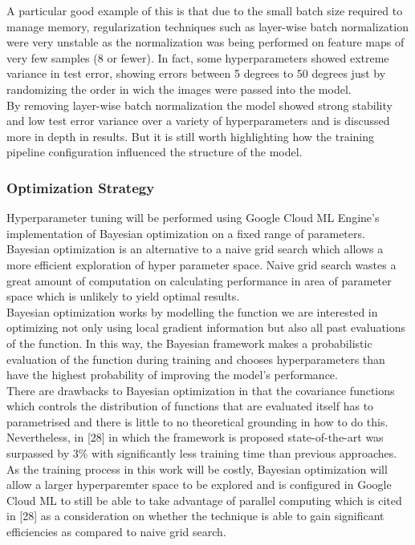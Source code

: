 \documentclass{article}
\begin{document}
A particular good example of this is that due to the small batch size required to manage memory, regularization techniques such as layer-wise batch normalization were very unstable as the normalization was being performed on feature maps of very few samples (8 or fewer). In fact, some hyperparameters showed extreme variance in test error, showing errors between 5 degrees to 50 degrees just by randomizing the order in wich the images were passed into the model. \\

By removing layer-wise batch normalization the model showed strong stability and low test error variance over a variety of hyperparameters and is discussed more in depth in results.  But it is still worth highlighting how the training pipeline configuration influenced the structure of the model. \\


\subsubsection{Optimization Strategy}

Hyperparameter tuning will be performed using Google Cloud ML Engine's implementation of Bayesian optimization on a fixed range of parameters. Bayesian optimization is an alternative to a naive grid search which allows a more efficient exploration of hyper parameter space. Naive grid search wastes a great amount of computation on calculating performance in area of parameter space which is unlikely to yield optimal results.\\

Bayesian optimization works by modelling the function we are interested in optimizing not only using local gradient information but also all past evaluations of the function. In this way, the Bayesian framework makes a probabilistic evaluation of the function during training and chooses hyperparameters than have the highest probability of improving the model's performance.\\

 There are drawbacks to Bayesian optimization in that the covariance functions which controls the distribution of functions that are evaluated itself has to parametrised and there is little to no theoretical grounding in how to do this. Nevertheless, in [28] in which the framework is proposed state-of-the-art was surpassed by 3\% with significantly less training time than previous approaches. As the training process in this work will be costly, Bayesian optimization will allow a larger hyperparemter space to be explored and is configured in Google Cloud ML to still be able to take advantage of parallel computing which is cited in [28] as a consideration on whether the technique is able to gain significant efficiencies as compared to naive grid search. \\
 
\end{document}
